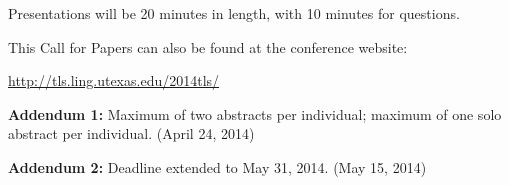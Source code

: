 \documentclass[11pt]{article}
\begin{document}
\medskip\noindent
Presentations will be 20 minutes in length, with 10 minutes for questions.

\medskip\noindent
This Call for Papers can also be found at the conference website:

\medskip
\url{http://tls.ling.utexas.edu/2014tls/}

\medskip
\noindent
\textbf{Addendum 1:}
  Maximum of two abstracts per individual; maximum of one solo abstract per individual.
  (April 24, 2014)

\noindent
\textbf{Addendum 2:}
  Deadline extended to May 31, 2014.
  (May 15, 2014)
\end{document}
